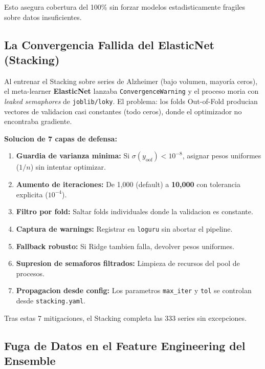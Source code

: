 \documentclass[12pt, letterpaper]{article}
\begin{document}
Esto asegura cobertura del 100\% sin forzar modelos estadisticamente fragiles sobre datos insuficientes.

\subsection{La Convergencia Fallida del ElasticNet (Stacking)}\label{subsec:convergence}

\begin{criticalbox}
Al entrenar el Stacking sobre series de Alzheimer (bajo volumen, mayoría ceros), el meta-learner \textbf{ElasticNet} lanzaba \texttt{ConvergenceWarning} y el proceso moria con \textit{leaked semaphores} de \texttt{joblib/loky}. El problema: los folds Out-of-Fold producian vectores de validacion casi constantes (todo ceros), donde el optimizador no encontraba gradiente.
\end{criticalbox}

\textbf{Solucion de 7 capas de defensa:}
\begin{enumerate}[noitemsep]
    \item \textbf{Guardia de varianza minima:} Si $\sigma(y_{\text{oof}}) < 10^{-8}$, asignar pesos uniformes ($1/n$) sin intentar optimizar.
    \item \textbf{Aumento de iteraciones:} De 1,000 (default) a \textbf{10,000} con tolerancia explicita ($10^{-4}$).
    \item \textbf{Filtro por fold:} Saltar folds individuales donde la validacion es constante.
    \item \textbf{Captura de warnings:} Registrar en \texttt{loguru} sin abortar el pipeline.
    \item \textbf{Fallback robusto:} Si Ridge tambien falla, devolver pesos uniformes.
    \item \textbf{Supresion de semaforos filtrados:} Limpieza de recursos del pool de procesos.
    \item \textbf{Propagacion desde config:} Los parametros \texttt{max\_iter} y \texttt{tol} se controlan desde \texttt{stacking.yaml}.
\end{enumerate}

Tras estas 7 mitigaciones, el Stacking completa las 333 series sin excepciones.

\subsection{Fuga de Datos en el Feature Engineering del Ensemble}\label{subsec:fuga_features}
\end{document}
